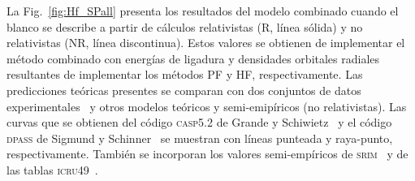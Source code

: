 \begin{comment}

\begin{figure}[t]
\centering
\texttt{[image: heavy/Hf\_RNR.eps]}
\caption[Secciones eficaces de Hf con y sin efectos relativistas.]
{Secciones eficaces de frenado de protones en Hf. Valores totales y 
de electrones ligados con descripción atómica relativista (R) y no 
relativista (NR). 
Símbolos: datos experimentales~\cite{Montanari:20,Sirotinin:84}.}
\label{fig:Hf_SP}
\end{figure}

En la Fig.~\ref{fig:Hf_SP} se comparan las predicciones dadas por el 
modelo combinado para la potencia de frenado de protones en Hf
cuando el blanco se describe a partir de cálculos relativistas (R, 
líneas sólidas) y no relativistas (NR, líneas discontinuas). Estos 
valores se obtienen de implementar los métodos PD y HF, respectivamente.
Las contribuciones a la potencia de frenado por el FEG son iguales 
cuando el blanco se describe mediante métodos relativistas y no 
relativistas y no se muestran. Por el contrario, el modelo SLPA depende 
totalmente de la descripción del blanco, ya que está determinado por los 
valores de energías de ligadura y densidades electrónicas. Se observa 
como la respuesta del modelo dieléctrico es menor, con el máximo corrido 
a energías más altas cuando se considera una estructura electrónica no 
relativista. Este comportamiento se traslada a los valores totales de 
sección eficaz. El modelo combinado con las predicciones teóricas 
relativistas tiene muy buen acuerdo con datos experimentales 
disponibles~\cite{Montanari:20,Sirotinin:84}, a excepción de la medida a 
80~keV de Sirotinin. Sin embargo, la descripción no relativista falla 
para valores de energía entre 100 y 400~keV. 

\end{comment}


La Fig.~\ref{fig:Hf_SPall} presenta los resultados del modelo combinado 
cuando el blanco se describe a partir de cálculos relativistas (R, 
línea sólida) y no relativistas (NR, línea discontinua). Estos valores 
se obtienen de implementar el método combinado con energías de ligadura
y densidades orbitales radiales resultantes de implementar los métodos 
PF y HF, respectivamente. Las predicciones teóricas presentes se 
comparan con dos conjuntos de datos 
experimentales~\cite{Montanari:20,Sirotinin:84} y otros modelos teóricos 
y semi-emipíricos (no relativistas). Las curvas que se obtienen del 
código \textsc{casp5.2} de Grande y Schiwietz~\cite{Grande:01,casp52} y 
el código \textsc{dpass} de Sigmund y Schinner~\cite{DPASS20} se 
muestran con líneas punteada y raya-punto, respectivamente. También se 
incorporan los valores semi-empíricos de \textsc{srim}~\cite{Ziegler01} 
y de las tablas \textsc{icru49}~\cite{ICRU49}. 

